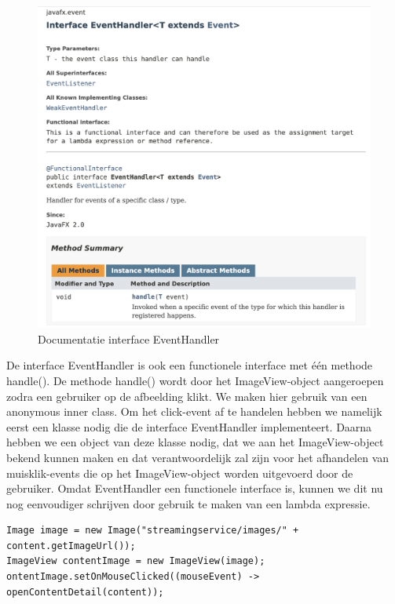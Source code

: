 \documentclass{tstextbook}
\begin{document}
\begin{figure}[H]
  \includegraphics[width=\linewidth]{images/h5/javadoc_eventhandler.png}
  \caption{Documentatie interface EventHandler}
  \label{fig:interface_eventhandler}
\end{figure}

De interface EventHandler is ook een functionele interface met \'e\'en methode handle().
De methode handle() wordt door het ImageView-object aangeroepen zodra een gebruiker op de afbeelding klikt.
We maken hier gebruik van een anonymous inner class.
Om het click-event af te handelen hebben we namelijk eerst een klasse nodig die de interface EventHandler implementeert. Daarna hebben we een object van deze klasse nodig, dat we aan het ImageView-object bekend kunnen maken en dat verantwoordelijk zal zijn voor het afhandelen van muisklik-events die op het ImageView-object worden uitgevoerd door de gebruiker. 
Omdat EventHandler een functionele interface is, kunnen we dit nu nog eenvoudiger schrijven door gebruik te maken van een lambda expressie.

\begin{lstlisting}
Image image = new Image("streamingservice/images/" + content.getImageUrl());
ImageView contentImage = new ImageView(image);
ontentImage.setOnMouseClicked((mouseEvent) -> openContentDetail(content));
\end{lstlisting}
\end{document}
